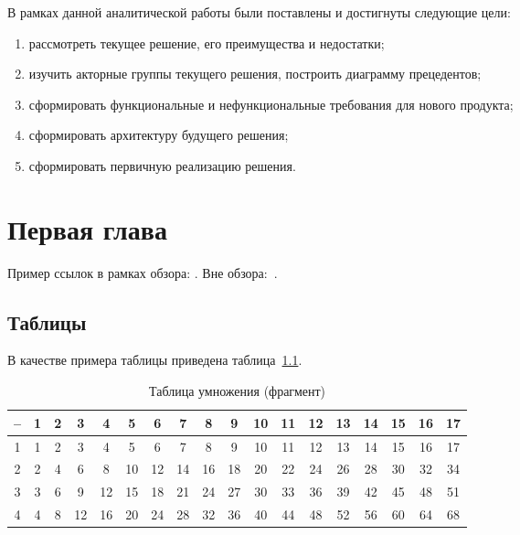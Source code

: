 \documentclass[times,numbers=noenddot]{itmo-student-thesis}
\begin{document}
В рамках данной аналитической работы были поставлены и достигнуты следующие цели:

\begin{enumerate}[label=\arabic*.]
	\item рассмотреть текущее решение, его преимущества и недостатки;
	\item изучить акторные группы текущего решения, построить диаграмму прецедентов;
	\item сформировать функциональные и нефункциональные требования для нового продукта;
	\item сформировать архитектуру будущего решения;
	\item сформировать первичную реализацию решения.
\end{enumerate}

\chapter{Первая глава}

\startrelatedwork
Пример ссылок в рамках обзора: \cite{example-english, example-russian, unrestricted-jump-evco, doerr-doerr-lambda-lambda-self-adjustment-arxiv}.
\finishrelatedwork
Вне обзора:~\cite{bellman}.

\section{Таблицы}\label{sec:tables}

В качестве примера таблицы приведена таблица~\ref{tab1}.

\begin{table}[!h]
	\caption{Таблица умножения (фрагмент)}\label{tab1}
	\centering
	\begin{tabular}{|*{18}{c|}}\hline
		-- & 1 & 2 & 3  & 4  & 5  & 6  & 7  & 8  & 9  & 10 & 11 & 12 & 13 & 14 & 15 & 16 & 17 \\\hline
		1  & 1 & 2 & 3  & 4  & 5  & 6  & 7  & 8  & 9  & 10 & 11 & 12 & 13 & 14 & 15 & 16 & 17 \\\hline
		2  & 2 & 4 & 6  & 8  & 10 & 12 & 14 & 16 & 18 & 20 & 22 & 24 & 26 & 28 & 30 & 32 & 34 \\\hline
		3  & 3 & 6 & 9  & 12 & 15 & 18 & 21 & 24 & 27 & 30 & 33 & 36 & 39 & 42 & 45 & 48 & 51 \\\hline
		4  & 4 & 8 & 12 & 16 & 20 & 24 & 28 & 32 & 36 & 40 & 44 & 48 & 52 & 56 & 60 & 64 & 68 \\\hline
	\end{tabular}
\end{table}
\end{document}
